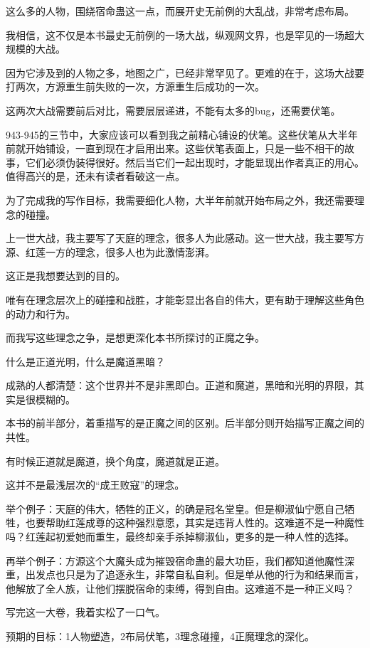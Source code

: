 \begin{this_body}
这么多的人物，围绕宿命蛊这一点，而展开史无前例的大乱战，非常考虑布局。

我相信，这不仅是本书最史无前例的一场大战，纵观网文界，也是罕见的一场超大规模的大战。

因为它涉及到的人物之多，地图之广，已经非常罕见了。更难的在于，这场大战要打两次，方源重生前失败的一次，方源重生后成功的一次。

这两次大战需要前后对比，需要层层递进，不能有太多的bug，还需要伏笔。

943-945的三节中，大家应该可以看到我之前精心铺设的伏笔。这些伏笔从大半年前就开始铺设，一直到现在才启用出来。这些伏笔表面上，只是一些不相干的故事，它们必须伪装得很好。然后当它们一起出现时，才能显现出作者真正的用心。值得高兴的是，还未有读者看破这一点。

为了完成我的写作目标，我需要细化人物，大半年前就开始布局之外，我还需要理念的碰撞。

上一世大战，我主要写了天庭的理念，很多人为此感动。这一世大战，我主要写方源、红莲一方的理念，很多人也为此激情澎湃。

这正是我想要达到的目的。

唯有在理念层次上的碰撞和战胜，才能彰显出各自的伟大，更有助于理解这些角色的动力和行为。

而我写这些理念之争，是想更深化本书所探讨的正魔之争。

什么是正道光明，什么是魔道黑暗？

成熟的人都清楚：这个世界并不是非黑即白。正道和魔道，黑暗和光明的界限，其实是很模糊的。

本书的前半部分，着重描写的是正魔之间的区别。后半部分则开始描写正魔之间的共性。

有时候正道就是魔道，换个角度，魔道就是正道。

这并不是最浅层次的“成王败寇”的理念。

举个例子：天庭的伟大，牺牲的正义，的确是冠名堂皇。但是柳淑仙宁愿自己牺牲，也要帮助红莲成尊的这种强烈意愿，其实是违背人性的。这难道不是一种魔性吗？红莲起初爱她而重生，最终却亲手杀掉柳淑仙，更多的是一种人性的选择。

再举个例子：方源这个大魔头成为摧毁宿命蛊的最大功臣，我们都知道他魔性深重，出发点也只是为了追逐永生，非常自私自利。但是单从他的行为和结果而言，他解放了全人族，让他们摆脱宿命的束缚，得到自由。这难道不是一种正义吗？

写完这一大卷，我着实松了一口气。

预期的目标：1人物塑造，2布局伏笔，3理念碰撞，4正魔理念的深化。


\end{this_body}
